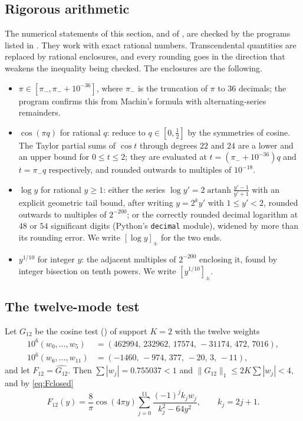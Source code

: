 \documentclass[11pt,colorlinks]{charlie}
\begin{document}
\subsection{Rigorous arithmetic}\label{sec:arith}
The numerical statements of this section, and of , are checked by the programs listed in . They work with exact rational numbers. Transcendental quantities are replaced by rational enclosures, and every rounding goes in the direction that weakens the inequality being checked. The enclosures are the following.
\begin{itemize}
\item $\pi\in[\pi_-,\pi_-+10^{-36}]$, where $\pi_-$ is the truncation of $\pi$ to $36$ decimals; the program confirms this from Machin's formula with alternating-series remainders.
\item $\cos(\pi q)$ for rational $q$: reduce to $q\in[0,\frac12]$ by the symmetries of cosine. The Taylor partial sums of $\cos t$ through degrees $22$ and $24$ are a lower and an upper bound for $0\le t\le2$; they are evaluated at $t=(\pi_-+10^{-36})q$ and $t=\pi_-q$ respectively, and rounded outwards to multiples of $10^{-18}$.
\item $\log y$ for rational $y\ge1$: either the series $\log y'=2\operatorname{artanh}\frac{y'-1}{y'+1}$ with an explicit geometric tail bound, after writing $y=2^ky'$ with $1\le y'<2$, rounded outwards to multiples of $2^{-200}$; or the correctly rounded decimal logarithm at $48$ or $54$ significant digits (Python's \texttt{decimal} module), widened by more than its rounding error. We write $[\log y]_\pm$ for the two ends.
\item $y^{1/10}$ for integer $y$: the adjacent multiples of $2^{-200}$ enclosing it, found by integer bisection on tenth powers. We write $[y^{1/10}]_\pm$.
\end{itemize}

\subsection{The twelve-mode test}
Let $G_{12}$ be the cosine test () of support $K=2$ with the twelve weights
\begin{align*}
 10^6(w_0,\dots,w_5)&=(462994,\,232962,\,17574,\,-31174,\,472,\,7016),\\
 10^6(w_6,\dots,w_{11})&=(-1460,\,-974,\,377,\,-20,\,3,\,-11),
\end{align*}
and let $F_{12}=\widehat{G_{12}}$. Then $\sum|w_j|=0.755037<1$ and $\|G_{12}\|_1\le2K\sum|w_j|<4$, and by \eqref{eq:Fclosed}
\[
 F_{12}(y)=\frac8\pi\cos(4\pi y)\sum_{j=0}^{11}\frac{(-1)^jk_jw_j}{k_j^2-64y^2},\qquad k_j=2j+1 .
\]
\end{document}
